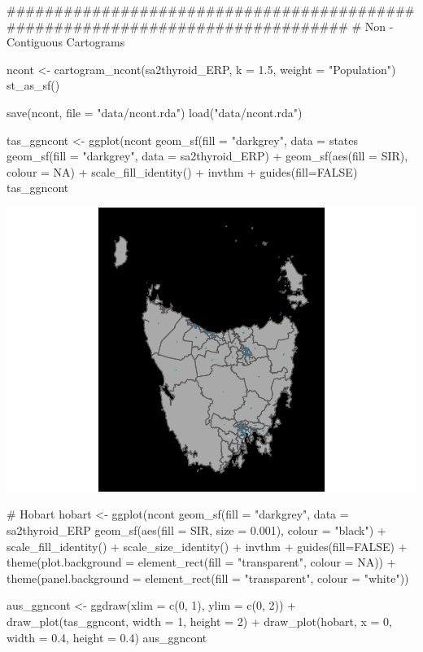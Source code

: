 \begin{Schunk}
\begin{Sinput}
###############################################################################
# Non - Contiguous Cartograms

ncont <- cartogram_ncont(sa2thyroid_ERP, k = 1.5,
                         weight = "Population") %
                          st_as_sf()


save(ncont, file = "data/ncont.rda")
load("data/ncont.rda")

tas_ggncont <- ggplot(ncont %
  geom_sf(fill = "darkgrey",  data = states %
  geom_sf(fill = "darkgrey",  data = sa2thyroid_ERP) +
  geom_sf(aes(fill = SIR), colour = NA) + 
  scale_fill_identity() + 
  invthm + guides(fill=FALSE)
tas_ggncont
\end{Sinput}

\includegraphics{kobakian-cook_files/figure-latex/unnamed-chunk-1-1} \begin{Sinput}
# Hobart
hobart <- ggplot(ncont %
  geom_sf(fill = "darkgrey",  data = sa2thyroid_ERP %
  geom_sf(aes(fill = SIR, size = 0.001), colour = "black") + 
  scale_fill_identity() + 
  scale_size_identity() +
  invthm + guides(fill=FALSE) + 
  theme(plot.background = element_rect(fill = "transparent", colour = NA)) + 
  theme(panel.background = element_rect(fill = "transparent", colour = "white"))
  

aus_ggncont <- ggdraw(xlim = c(0, 1), ylim = c(0, 2)) +
  draw_plot(tas_ggncont, width = 1, height = 2) +
  draw_plot(hobart, x = 0, width = 0.4, height = 0.4)
aus_ggncont
\end{Sinput}


\end{Schunk}
